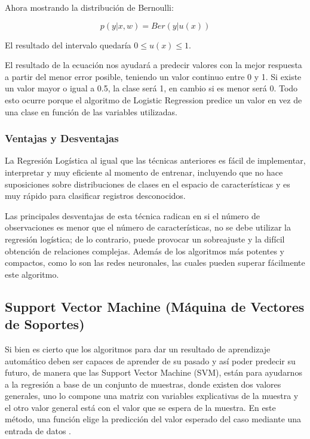 \par Ahora mostrando la distribución de Bernoulli:\\
\begin{Large}
	\begin{equation}
		p(y|x,w) = Ber(y|u(x))
	\end{equation}
\end{Large}
\begin{center}
	El resultado del intervalo quedaría $0 \leq u(x) \leq 1$.\\
\end{center}
\par El resultado de la ecuación nos ayudará a predecir valores con la mejor respuesta a partir del menor error posible, teniendo un valor continuo entre 0 y 1. Si existe un valor mayor o igual a 0.5, la clase será 1, en cambio si es menor será 0. Todo esto ocurre porque el algoritmo de Logistic Regression predice un valor en vez de una clase en función de las variables utilizadas.\\

\doublespacing
\subsubsection{Ventajas y Desventajas}
La Regresión Logística al igual que las técnicas anteriores es fácil de implementar, interpretar y muy eficiente al momento de entrenar, incluyendo que no hace suposiciones sobre distribuciones de clases en el espacio de características y es muy rápido para clasificar registros desconocidos.\\
\par Las principales desventajas de esta técnica radican en si el número de observaciones es menor que el número de características, no se debe utilizar la regresión logística; de lo contrario, puede provocar un sobreajuste y la difícil obtención de relaciones complejas.  Además de los algoritmos más potentes y compactos, como lo son las redes neuronales, las cuales pueden superar fácilmente este algoritmo. \\


\doublespacing
\subsection{Support Vector Machine (Máquina de Vectores de Soportes)}
Si bien es cierto que los algoritmos para dar un resultado de aprendizaje automático deben ser capaces de aprender de su pasado y así poder predecir su futuro, de manera que las Support Vector Machine (SVM), están para ayudarnos a la regresión a base de un conjunto de muestras, donde existen dos valores generales, uno lo compone una matriz con variables explicativas de la muestra y el otro valor general está con el valor que se espera de la muestra. En este método, una función elige la predicción del valor esperado del caso mediante una entrada de datos  \cite{Dantas2021}.\\

